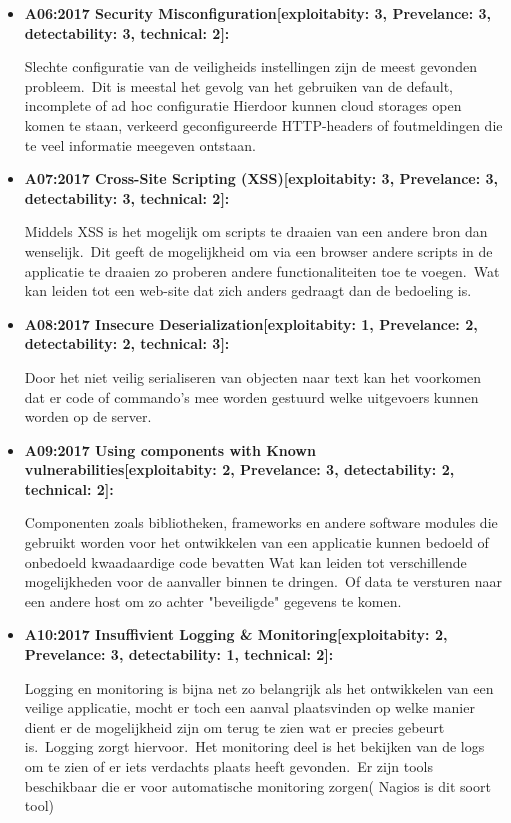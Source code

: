 \begin{itemize}
    \item \textbf{A06:2017 Security Misconfiguration[exploitabity: 3, Prevelance: 3, detectability: 3, technical: 2]:}

    Slechte configuratie van de veiligheids instellingen zijn de meest gevonden probleem.\ Dit is meestal het gevolg van het gebruiken van de default, incomplete of ad hoc configuratie Hierdoor kunnen cloud storages open komen te staan, verkeerd geconfigureerde HTTP-headers of foutmeldingen die te veel informatie meegeven ontstaan.

    \item \textbf{A07:2017 Cross-Site Scripting (XSS)[exploitabity: 3, Prevelance: 3, detectability: 3, technical: 2]:}

    Middels XSS is het mogelijk om scripts te draaien van een andere bron dan wenselijk.\ Dit geeft de mogelijkheid om via een browser andere scripts in de applicatie te draaien zo proberen andere functionaliteiten toe te voegen.\ Wat kan leiden tot een web-site dat zich anders gedraagt dan de bedoeling is.

    \item \textbf{A08:2017 Insecure Deserialization[exploitabity: 1, Prevelance: 2, detectability: 2, technical: 3]:}

    Door het niet veilig serialiseren van objecten naar text kan het voorkomen dat er code of commando's mee worden gestuurd welke uitgevoers kunnen worden op de server.

    \item \textbf{A09:2017 Using components with Known vulnerabilities[exploitabity: 2, Prevelance: 3, detectability: 2, technical: 2]:}

    Componenten zoals bibliotheken, frameworks en andere software modules die gebruikt worden voor het ontwikkelen van een applicatie kunnen bedoeld of onbedoeld kwaadaardige code bevatten Wat kan leiden tot verschillende mogelijkheden voor de aanvaller binnen te dringen.\ Of data te versturen naar een andere host om zo achter "beveiligde" gegevens te komen.

    \item \textbf{A10:2017 Insuffivient Logging \& Monitoring[exploitabity: 2, Prevelance: 3, detectability: 1, technical: 2]:}

    Logging en monitoring is bijna net zo belangrijk als het ontwikkelen van een veilige applicatie, mocht er toch een aanval plaatsvinden op welke manier dient er de mogelijkheid zijn om terug te zien wat er precies gebeurt is.\ Logging zorgt hiervoor.\ Het monitoring deel is het bekijken van de logs om te zien of er iets verdachts plaats heeft gevonden.\ Er zijn tools beschikbaar die er voor automatische monitoring zorgen( Nagios is dit soort tool)

\end{itemize}

